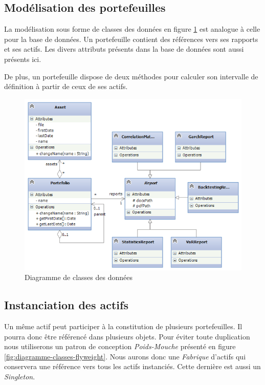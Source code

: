 \documentclass[a4paper,titlepage,french]{report}
\begin{document}
\subsection{Modélisation des portefeuilles}

La modélisation sous forme de classes des données en figure \ref{fig:diagramme-classes-donnees} est analogue à celle pour la base de données. Un portefeuille contient des références vers ses rapports et ses actifs. Les divers attributs présents dans la base de données sont aussi présents ici.

De plus, un portefeuille dispose de deux méthodes pour calculer son intervalle de définition à partir de ceux de ses actifs.

\begin{figure}
  	\center
  	\includegraphics[width=1\textwidth]{diagramme-classes-donnees.png}
  	\caption{Diagramme de classes des données}
  	\label{fig:diagramme-classes-donnees}
\end{figure}


\subsection{Instanciation des actifs}

Un même actif peut participer à la constitution de plusieurs portefeuilles.
Il pourra donc être référencé dans plusieurs objets.
Pour éviter toute duplication nous utiliserons un patron de conception \textit{Poids-Mouche} présenté en figure \ref{fig:diagramme-classes-flyweight}.
Nous aurons donc une \textit{Fabrique} d'actifs qui conservera une référence vers tous les actifs instanciés. Cette dernière est aussi un \textit{Singleton}.
\end{document}
